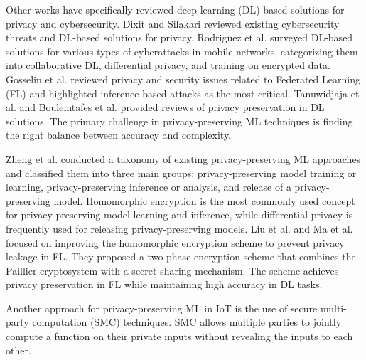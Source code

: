 Other works have specifically reviewed deep learning (DL)-based solutions for privacy and cybersecurity. Dixit and Silakari reviewed existing cybersecurity threats and DL-based solutions for privacy. Rodriguez et al. surveyed DL-based solutions for various types of cyberattacks in mobile networks, categorizing them into collaborative DL, differential privacy, and training on encrypted data. Gosselin et al. reviewed privacy and security issues related to Federated Learning (FL) and highlighted inference-based attacks as the most critical. Tanuwidjaja et al. and Boulemtafes et al. provided reviews of privacy preservation in DL solutions. The primary challenge in privacy-preserving ML techniques is finding the right balance between accuracy and complexity.

Zheng et al. conducted a taxonomy of existing privacy-preserving ML approaches and classified them into three main groups: privacy-preserving model training or learning, privacy-preserving inference or analysis, and release of a privacy-preserving model. Homomorphic encryption is the most commonly used concept for privacy-preserving model learning and inference, while differential privacy is frequently used for releasing privacy-preserving models. Liu et al. and Ma et al. focused on improving the homomorphic encryption scheme to prevent privacy leakage in FL. They proposed a two-phase encryption scheme that combines the Paillier cryptosystem with a secret sharing mechanism. The scheme achieves privacy preservation in FL while maintaining high accuracy in DL tasks.

Another approach for privacy-preserving ML in IoT is the use of secure multi-party computation (SMC) techniques. SMC allows multiple parties to jointly compute a function on their private inputs without revealing the inputs to each other.



\newpage

    \nocite{*}
    



